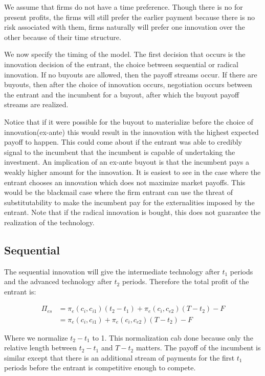 
We assume that firms do not have a time preference. Though there is no  for present profits, the firms will still prefer the earlier payment because there is no risk associated with them, firms naturally will prefer one innovation over the other because of their time structure. 

We now specify the timing of the model. The first decision that occurs is the innovation decision of the entrant, the choice between sequential or radical innovation. If no buyouts are allowed, then the payoff streams occur. If there are buyouts, then after the choice of innovation occurs, negotiation occurs between the entrant and the incumbent for a buyout, after which the buyout payoff streams are realized.

Notice that if it were possible for the buyout to materialize before the choice of innovation(ex-ante) this would result in the innovation with the highest expected payoff to happen. This could come about if the entrant was able to credibly signal to the incumbent that the incumbent is capable of undertaking the investment. An implication of an ex-ante buyout is that the incumbent pays a weakly higher amount for the innovation. It is easiest to see in the case where the entrant chooses an innovation which does not maximize market payoffs. This would be the blackmail case where the firm entrant can use the threat of substitutability to make the incumbent pay for the externalities imposed by the entrant. Note that if the radical innovation is bought, this does not guarantee the realization of the technology. 

\subsection{Sequential}

The sequential innovation will give the intermediate technology after $t_1$ periods and the advanced technology after $t_2$ periods. Therefore the total profit of the entrant is: 

\begin{align*}
\Pi_{es} &= \pi_e(c_i,c_{i1}) (t_2-t_1) +\pi_e(c_i,c_{e2})(T-t_2)-F \\
&= \pi_e(c_i,c_{i1}) +\pi_e(c_i,c_{e2})(T-t_2)-F
\end{align*}

Where we normalize $t_2-t_1$ to 1. This normalization cab done because only the relative length between $t_2-t_1$ and $T-t_2$ matters. The payoff of the incumbent is similar except that there is an additional stream of payments for the first $t_1$ periods before the entrant is competitive enough to compete. 

